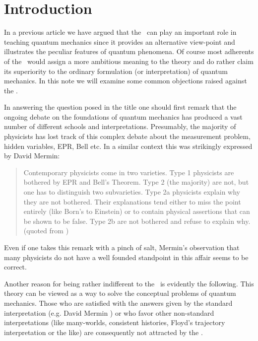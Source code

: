 
\section{Introduction}
In a previous article \cite{how_to} we have argued that the \dbb\ can play an important role in teaching 
quantum mechanics since it provides an alternative view-point and illustrates the peculiar features of quantum phenomena.
Of course most adherents of the \dbb\ would assign a more ambitious meaning to the theory  and do rather claim its 
superiority to the ordinary formulation (or interpretation) of quantum mechanics.
In this note we will examine some common objections raised against the \dbb.

In answering the question posed in the title one should first remark that the ongoing debate on the foundations of 
quantum mechanics has produced a vast number of different schools and interpretations. 
Presumably, the majority of physicists has lost track of this complex debate 
about the measurement problem, hidden variables, EPR, Bell etc. In a similar context this was strikingly 
expressed by David Mermin:
\begin{quote}
Contemporary physicists come in two varieties. Type 1 physicists are bothered
by EPR and Bell's Theorem. Type 2 (the majority) are not, but one has to
distinguish two subvarieties. Type 2a physicists explain why they are not
bothered. Their explanations tend either to miss the point entirely
(like Born's to Einstein) or to contain physical assertions that can be shown
to be false.  Type 2b are not bothered and refuse to explain why.
(quoted from \cite{straumann})
\end{quote}
Even if one takes this remark with a pinch of salt, Mermin's observation that many physicists do not have a well founded 
standpoint in  this affair seems to be correct.

Another reason for being rather indifferent to the \dbb\ is evidently the following. This theory can be viewed as 
a way to solve the conceptual problems of quantum mechanics. Those who are satisfied with the answers given by the standard 
interpretation (e.g. David Mermin \cite{love}) or who favor other non-standard interpretations (like many-worlds, 
consistent histories, Floyd's trajectory interpretation or the like) are consequently not attracted by the \dbb.


